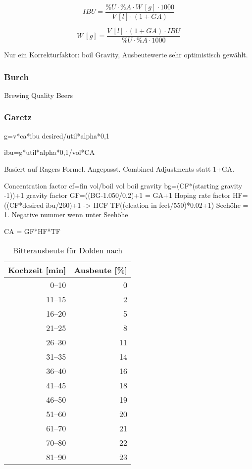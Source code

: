 \documentclass[a4paper,parskip=half]{scrartcl}
\begin{document}

\begin{equation}
\mathit{IBU} = \frac{\%U \cdot \%A \cdot W\:[g] \cdot 1000}{V\:[l] \cdot (1 + \mathit{GA})}
\label{eq:rageribu}
\end{equation}

\begin{equation}
W\:[g] = \frac{V\:[l] \cdot (1 + \mathit{GA}) \cdot \mathit{IBU}}{\%U \cdot \%A \cdot 1000}
\label{eq:ragerw}
\end{equation}

\parencite[134]{Garetz1994} 
Nur ein Korrekturfaktor: boil Gravity, Ausbeutewerte sehr optimistisch
gewählt. 

\subsubsection*{Burch}
Brewing Quality Beers

\subsubsection*{Garetz}

g=v*ca*ibu desired/util*alpha*0,1

ibu=g*util*alpha*0,1/vol*CA

\parencite[134-144]{Garetz1994} 
Basiert auf Ragers Formel. Angepasst. Combined
Adjustments statt 1+GA.

Concentration factor
cf=fin vol/boil vol
boil gravity bg=(CF*(starting gravity -1))+1
gravity factor
GF=((BG-1.050/0.2)+1 = GA+1
Hoping rate factor
HF=((CF*desired ibu/260)+1  -> HCF
TF((eleation in feet/550)*0.02+1)
Seehöhe = 1. Negative nummer wenn unter Seehöhe

CA = GF*HF*TF

\begin{table}[H]
\centering
\begin{tabular}{rr}
\toprule
\multicolumn{1}{c}{\textbf{Kochzeit [min]}} & \multicolumn{1}{c}{\textbf{Ausbeute [\%]}} \\
\midrule
0–10            & 0 \\
11–15           & 2 \\
16–20           & 5 \\
21–25           & 8 \\
26–30           & 11 \\
31–35           & 14 \\
36–40           & 16 \\
41–45           & 18 \\
46–50           & 19 \\
51–60           & 20 \\
61–70           & 21 \\
70–80           & 22 \\
81–90           & 23 \\
\bottomrule
\end{tabular}
\caption{Bitterausbeute für Dolden nach \citeauthor{Garetz1994} \parencite[138]{Garetz1994}}
\label{table:garetzutil}
\end{table}
\end{document}
